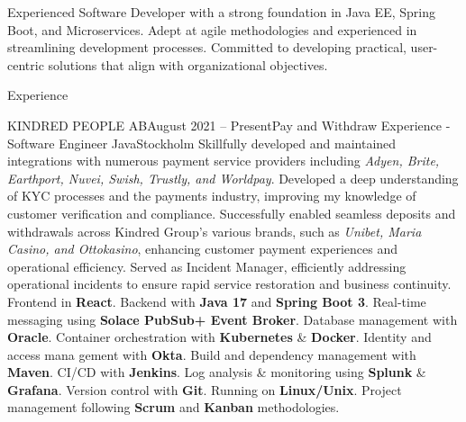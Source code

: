 \documentclass{resume}
\begin{document}
  \noindent
  \linebreak
  Experienced Software Developer with a strong foundation in Java EE, Spring Boot, and Microservices. Adept at agile methodologies and experienced in streamlining development processes. Committed to developing practical, user-centric solutions that align with organizational objectives.

  \begin{rSection}{Experience}
    \begin{rSubsection}{KINDRED PEOPLE AB}{August 2021 -- Present}{Pay and Withdraw Experience - Software Engineer Java}{Stockholm}
      \bItem Skillfully developed and maintained integrations with numerous payment service providers including \textit{Adyen, Brite, Earthport, Nuvei, Swish, Trustly, and Worldpay}.
      \bItem Developed a deep understanding of KYC processes and the payments industry, improving my knowledge of customer verification and compliance.
      \bItem Successfully enabled seamless deposits and withdrawals across Kindred Group's various brands, such as \textit{Unibet, Maria Casino, and Ottokasino}, enhancing customer payment experiences and operational efficiency.
      \bItem Served as Incident Manager, efficiently addressing operational incidents to ensure rapid service restoration and business continuity.
      \techItem Frontend in \textbf{React}. Backend with \textbf{Java 17} and \textbf{Spring Boot 3}. Real-time messaging using \textbf{Solace PubSub+ Event Broker}. Database management with \textbf{Oracle}. Container orchestration with \textbf{Kubernetes} \& \textbf{Docker}. Identity and access mana
      gement with \textbf{Okta}. Build and dependency management with \textbf{Maven}. CI/CD with \textbf{Jenkins}. Log analysis \& monitoring using \textbf{Splunk} \& \textbf{Grafana}. Version control with \textbf{Git}. Running on \textbf{Linux/Unix}. Project management following \textbf{Scrum} and \textbf{Kanban} methodologies.
    \end{rSubsection}


\end{rSection}
\end{document}
